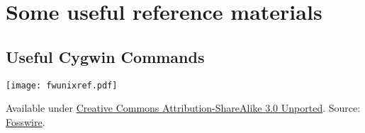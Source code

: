 \section{Some useful reference materials}

	\subsection{Useful Cygwin Commands}
	\begin{center}\begin{minipage}{\linewidth}
    \centering
    \texttt{[image: fwunixref.pdf]}

   	Available under \href{http://creativecommons.org/licenses/by-sa/3.0/}{Creative Commons Attribution-ShareAlike 3.0 Unported}.  Source: \href{https://fosswire.com/post/2007/08/unixlinux-command-cheat-sheet/}{Fosswire}.
    \end{minipage}\end{center}
